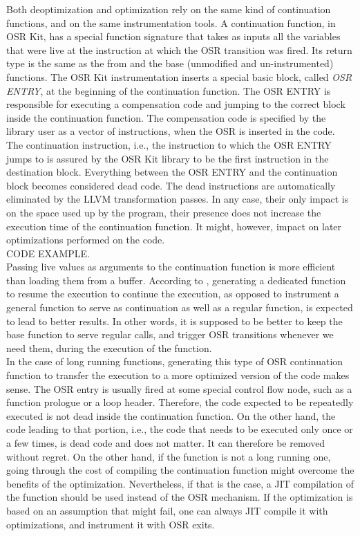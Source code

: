 Both deoptimization and optimization rely on the same kind of continuation functions, and on the same instrumentation tools.
A continuation function, in OSR Kit, has a special function signature that takes as inputs all the variables that were live at the instruction at which the OSR transition was fired.
Its return type is the same as the from and the base (unmodified and un-instrumented) functions.
The OSR Kit instrumentation inserts a special basic block, called \textit{OSR ENTRY}, at the beginning of the continuation function.
The OSR ENTRY is responsible for executing a compensation code and jumping to the correct block inside the continuation function.
The compensation code is specified by the library user as a vector of instructions, when the OSR is inserted in the code.
The continuation instruction, i.e., the instruction to which the OSR ENTRY jumps to is assured by the OSR Kit library to be the first instruction in the destination block.
Everything between the OSR ENTRY and the continuation block becomes considered dead code.
The dead instructions are automatically eliminated by the LLVM transformation passes.
In any case, their only impact is on the space used up by the program, their presence does not increase the execution time of the continuation function.
It might, however, impact on later optimizations performed on the code.\\

CODE EXAMPLE.\\

Passing live values as arguments to the continuation function is more efficient than loading them from a buffer.
According to \cite{fink2003design}, generating a dedicated function to resume the execution to continue the execution, as opposed to instrument a general function to serve as continuation as well as a regular function, is expected to lead to better results.
In other words, it is supposed to be better to keep the base function to serve regular calls, and trigger OSR transitions whenever we need them, during the execution of the function.\\

In the case of long running functions, generating this type of OSR continuation function to transfer the execution to a more optimized version of the code makes sense.
The OSR entry is usually fired at some special control flow node, such as a function prologue or a loop header.
Therefore, the code expected to be repeatedly executed is not dead inside the continuation function.
On the other hand, the code leading to that portion, i.e., the code that needs to be executed only once or a few times, is dead code and does not matter.
It can therefore be removed without regret.
On the other hand, if the function is not a long running one, going through the cost of compiling the continuation function might overcome the benefits of the optimization. 
Nevertheless, if that is the case, a JIT compilation of the function should be used instead of the OSR mechanism.
If the optimization is based on an assumption that might fail, one can always JIT compile it with optimizations, and instrument it with OSR exits.\\


